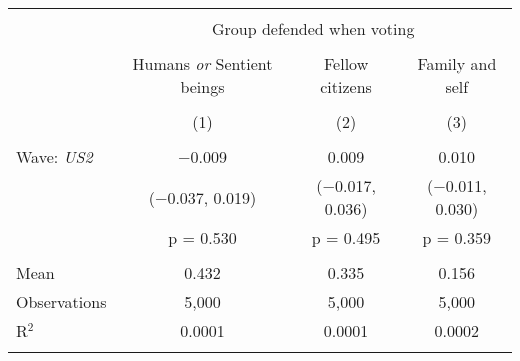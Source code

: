 
\begin{tabular}{@{\extracolsep{5pt}}lccc} 
\\[-1.8ex]\hline 
\hline \\[-1.8ex] 
 & \multicolumn{3}{c}{Group defended when voting} \\ 
\cline{2-4} 
\\[-1.8ex] & Humans \textit{or} Sentient beings & Fellow citizens & Family and self \\ 
\\[-1.8ex] & (1) & (2) & (3)\\ 
\hline \\[-1.8ex] 
 Wave: \textit{US2} & $-$0.009 & 0.009 & 0.010 \\ 
  & ($-$0.037, 0.019) & ($-$0.017, 0.036) & ($-$0.011, 0.030) \\ 
  & p = 0.530 & p = 0.495 & p = 0.359 \\ 
 \hline \\[-1.8ex] 
Mean & 0.432 & 0.335 & 0.156 \\ 
Observations & 5,000 & 5,000 & 5,000 \\ 
R$^{2}$ & 0.0001 & 0.0001 & 0.0002 \\ 
\hline 
\hline \\[-1.8ex] 
\end{tabular} 